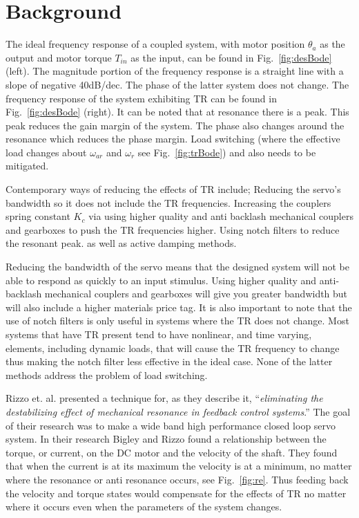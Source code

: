 \section{Background}\label{sec:back}
The ideal frequency response of a coupled system, with motor position $\theta_a$ as the output and motor torque $T_{in}$ as the input, can be found in Fig.~\ref{fig:desBode} (left). The magnitude portion of the frequency response is a straight line with a slope of negative 40dB/dec. The phase of the latter system does not change. The frequency response of the system exhibiting TR can be found in Fig.~\ref{fig:desBode} (right). It can be noted that at resonance there is a peak. This peak reduces the gain margin of the system. The phase also changes around the resonance which reduces the phase margin.  Load switching (where the effective load changes about $\omega_{ar}$ and $\omega_r$ see Fig.~\ref{fig:trBode}) and also needs to be mitigated.

Contemporary ways of reducing the effects of TR include; Reducing the servo's bandwidth so it does not include the TR frequencies. Increasing the couplers spring constant $K_c$ via using higher quality and anti backlash mechanical couplers and gearboxes to push the TR frequencies higher. Using notch filters to reduce the resonant peak. as well as active damping methods\cite{5730488}.   

Reducing the bandwidth of the servo means that the designed system will not be able to respond as quickly to an input stimulus. Using higher quality and anti-backlash mechanical couplers and gearboxes will give you greater bandwidth but will also include a higher materials price tag. It is also important to note that the use of notch filters is only useful in systems where the TR does not change. Most systems that have TR present tend to have nonlinear, and time varying, elements, including dynamic loads, that will cause the TR frequency to change thus making the notch filter less effective in the ideal case.  None of the latter methods address the problem of load switching.

Rizzo et. al.\cite{bigley1978resonance} presented a technique for, as they describe it, ``\textit{eliminating the destabilizing effect of mechanical resonance in feedback control systems}.''  The goal of their research was to make a wide band high performance closed loop servo system. In their research Bigley and Rizzo found a relationship between the torque, or current, on the DC motor and the velocity of the shaft. They found that when the current is at its maximum the velocity is at a minimum, no matter where the resonance or anti resonance occurs, see Fig.~\ref{fig:re}. Thus feeding back the velocity and torque states would compensate for the effects of TR no matter where it occurs even when the parameters of the system changes.

